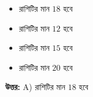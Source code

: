 \documentclass[12pt, a4paper]{article}
\begin{document}
\begin{itemize}[label={}, leftmargin=1cm, itemsep=0.5em]
    \item[\textbf{A)}] রাশিটির মান $18$ হবে
    \item[\textbf{B)}] রাশিটির মান $12$ হবে
    \item[\textbf{C)}] রাশিটির মান $15$ হবে
    \item[\textbf{D)}] রাশিটির মান $20$ হবে
\end{itemize}

\vspace{0.5em}
\begin{tcolorbox}[answerbox]
    \textbf{\color{success} উত্তর:} A) রাশিটির মান $18$ হবে
\end{tcolorbox}
\vspace{1em}
\end{document}
